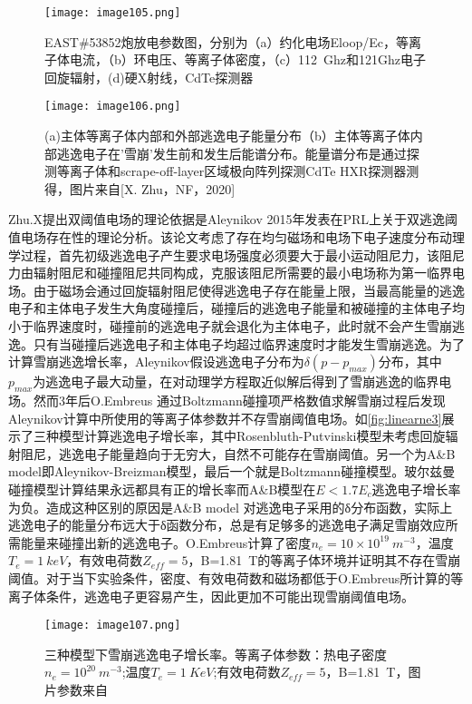 \begin{figure}
\centering
\texttt{[image: image105.png]}
\caption{\label{fig:linearne}EAST\#53852炮放电参数图，分别为（a）约化电场Eloop/Ec，等离子体电流，（b）环电压、等离子体密度，（c）112~Ghz和121Ghz电子回旋辐射，(d)硬X射线，CdTe探测器
}
\end{figure}


\begin{figure}
\centering
\texttt{[image: image106.png]}
\caption{\label{fig:linearne2}(a)主体等离子体内部和外部逃逸电子能量分布（b）主体等离子体内部逃逸电子在’雪崩’发生前和发生后能谱分布。能量谱分布是通过探测等离子体和scrape-off-layer区域极向阵列探测CdTe HXR探测器测得，图片来自[X. Zhu，NF，2020]\cite{RN960}}
\end{figure}


Zhu.X提出双阈值电场的理论依据是Aleynikov 2015年发表在PRL上关于双逃逸阈值电场存在性的理论分析\cite{RN1805}。该论文考虑了存在均匀磁场和电场下电子速度分布动理学过程，首先初级逃逸电子产生要求电场强度必须要大于最小运动阻尼力，该阻尼力由辐射阻尼和碰撞阻尼共同构成，克服该阻尼所需要的最小电场称为第一临界电场。由于磁场会通过回旋辐射阻尼使得逃逸电子存在能量上限，当最高能量的逃逸电子和主体电子发生大角度碰撞后，碰撞后的逃逸电子能量和被碰撞的主体电子均小于临界速度时，碰撞前的逃逸电子就会退化为主体电子，此时就不会产生雪崩逃逸。只有当碰撞后逃逸电子和主体电子均超过临界速度时才能发生雪崩逃逸。为了计算雪崩逃逸增长率，Aleynikov假设逃逸电子分布为$δ(p-p_{max} )$分布，其中$p_{max}$为逃逸电子最大动量，在对动理学方程取近似解后得到了雪崩逃逸的临界电场。然而3年后O.Embreus\cite{RN1811}		通过Boltzmann碰撞项严格数值求解雪崩过程后发现Aleynikov计算中所使用的等离子体参数并不存雪崩阈值电场。如\autoref{fig:linearne3}展示了三种模型计算逃逸电子增长率，其中Rosenbluth-Putvinski\cite{RN1793}模型未考虑回旋辐射阻尼，逃逸电子能量趋向于无穷大，自然不可能存在雪崩阈值。另一个为A\&B model即Aleynikov-Breizman模型，最后一个就是Boltzmann碰撞模型。玻尔兹曼碰撞模型计算结果永远都具有正的增长率而A\&B模型在$E<1.7E_c$逃逸电子增长率为负。造成这种区别的原因是A\&B model 对逃逸电子采用的δ分布函数，实际上逃逸电子的能量分布远大于δ函数分布，总是有足够多的逃逸电子满足雪崩效应所需能量来碰撞出新的逃逸电子。O.Embreus计算了密度$n_e=10\times10^{19}~ m^{-3}$，温度$T_e=1~keV$，有效电荷数$Z_{eff}=5$，B=1.81~T的等离子体环境并证明其不存在雪崩阈值。对于当下实验条件，密度、有效电荷数和磁场都低于O.Embreus所计算的等离子体条件，逃逸电子更容易产生，因此更加不可能出现雪崩阈值电场。


\begin{figure}
\centering
\texttt{[image: image107.png]}
\caption{\label{fig:linearne3}三种模型下雪崩逃逸电子增长率。等离子体参数：热电子密度$n_e=10^{20} ~m^{-3}$;温度$T_e=1~KeV$;有效电荷数$Z_{eff}=5$，B=1.81~T，图片参数来自\cite{RN1811}}
\end{figure}
